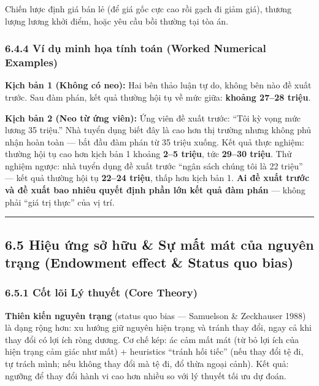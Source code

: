 \documentclass[
]{article}
\begin{document}
Chiến lược định giá bán lẻ (để giá gốc cực cao rồi gạch đi giảm giá),
thương lượng lương khởi điểm, hoặc yêu cầu bồi thường tại tòa án.

\subsubsection{6.4.4 Ví dụ minh họa tính toán (Worked Numerical
Examples)}\label{vuxed-dux1ee5-minh-hux1ecda-tuxednh-touxe1n-worked-numerical-examples-11}

\textbf{Kịch bản 1 (Không có neo):} Hai bên thảo luận tự do, không bên
nào đề xuất trước. Sau đàm phán, kết quả thường hội tụ về mức giữa:
\textbf{khoảng 27--28 triệu}.

\textbf{Kịch bản 2 (Neo từ ứng viên):} Ứng viên đề xuất trước: ``Tôi kỳ
vọng mức lương 35 triệu.'' Nhà tuyển dụng biết đây là cao hơn thị trường
nhưng không phủ nhận hoàn toàn --- bắt đầu đàm phán từ 35 triệu xuống.
Kết quả thực nghiệm: thường hội tụ cao hơn kịch bản 1 khoảng
\textbf{2--5 triệu}, tức \textbf{29--30 triệu}. Thử nghiệm ngược: nhà
tuyển dụng đề xuất trước ``ngân sách chúng tôi là 22 triệu'' --- kết quả
thường hội tụ \textbf{22--24 triệu}, thấp hơn kịch bản 1. \textbf{Ai đề
xuất trước và đề xuất bao nhiêu quyết định phần lớn kết quả đàm phán}
--- không phải ``giá trị thực'' của vị trí.

\begin{center}\rule{0.5\linewidth}{0.5pt}\end{center}

\subsection{6.5 Hiệu ứng sở hữu \& Sự mất mát của nguyên trạng
(Endowment effect \& Status quo
bias)}\label{hiux1ec7u-ux1ee9ng-sux1edf-hux1eefu-sux1ef1-mux1ea5t-muxe1t-cux1ee7a-nguyuxean-trux1ea1ng-endowment-effect-status-quo-bias}

\subsubsection{6.5.1 Cốt lõi Lý thuyết (Core
Theory)}\label{cux1ed1t-luxf5i-luxfd-thuyux1ebft-core-theory-12}

\textbf{Thiên kiến nguyên trạng} (status quo bias --- Samuelson \&
Zeckhauser 1988) là dạng rộng hơn: xu hướng giữ nguyên hiện trạng và
tránh thay đổi, ngay cả khi thay đổi có lợi ích ròng dương. Cơ chế kép:
ác cảm mất mát (từ bỏ lợi ích của hiện trạng cảm giác như mất) +
heuristics ``tránh hối tiếc'' (nếu thay đổi tệ đi, tự trách mình; nếu
không thay đổi mà tệ đi, đổ thừa ngoại cảnh). Kết quả: ngưỡng để thay
đổi hành vi cao hơn nhiều so với lý thuyết tối ưu dự đoán.
\end{document}
